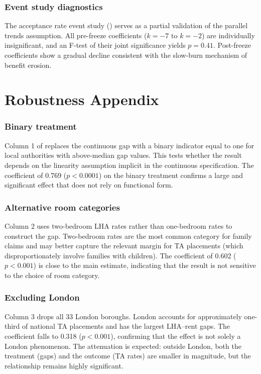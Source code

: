 \documentclass[12pt]{article}
\begin{document}
\subsubsection*{Event study diagnostics} The acceptance rate event study () serves as a partial validation of the parallel trends assumption. All pre-freeze coefficients ($k = -7$ to $k = -2$) are individually insignificant, and an F-test of their joint significance yields $p = 0.41$. Post-freeze coefficients show a gradual decline consistent with the slow-burn mechanism of benefit erosion.


\section{Robustness Appendix}
\label{sec:robust_appendix}

\subsubsection*{Binary treatment} Column 1 of  replaces the continuous gap with a binary indicator equal to one for local authorities with above-median gap values. This tests whether the result depends on the linearity assumption implicit in the continuous specification. The coefficient of 0.769 ($p < 0.0001$) on the binary treatment confirms a large and significant effect that does not rely on functional form.

\subsubsection*{Alternative room categories} Column 2 uses two-bedroom LHA rates rather than one-bedroom rates to construct the gap. Two-bedroom rates are the most common category for family claims and may better capture the relevant margin for TA placements (which disproportionately involve families with children). The coefficient of 0.602 ($p < 0.001$) is close to the main estimate, indicating that the result is not sensitive to the choice of room category.

\subsubsection*{Excluding London} Column 3 drops all 33 London boroughs. London accounts for approximately one-third of national TA placements and has the largest LHA--rent gaps. The coefficient falls to 0.318 ($p < 0.001$), confirming that the effect is not solely a London phenomenon. The attenuation is expected: outside London, both the treatment (gaps) and the outcome (TA rates) are smaller in magnitude, but the relationship remains highly significant.
\end{document}
